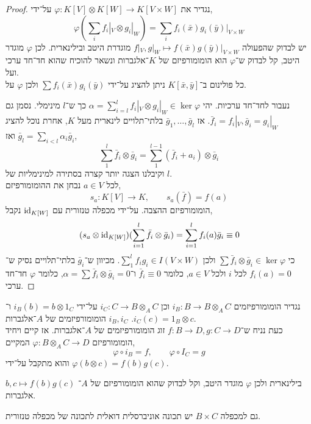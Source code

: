 \begin{proof}
	נגדיר את $\varphi : K[V] \otimes K[W] \to K[V \times W]$ על־ידי,
	\[
		\varphi(\sum_i f_i |_V \otimes g_i |_W)
		= \sum_i f_i(\bar{x}) g_i(\bar{y}) |_{V \times W}
	\]
	יש לבדוק שהפעולה $f |_V, g |_W \mapsto f(\bar{x}) g(\bar{y}) |_{V \times W}$ מוגדרת היטב ובילינארית.
	לכן $\varphi$ מוגדר היטב, קל לבדוק ש־$\varphi$ הוא הומומורפיזם של $K$־אלגברות ונשאר להוכיח שהוא חד־חד ערכי ועל. \\
	כל פולינום ב־$K[\bar{x}, \bar{y}]$ ניתן להציג על־ידי $\sum f_i(\bar{x}) g_i(\bar{y})$ ולכן $\varphi$ על.

	נעבור לחד־חד ערכיות.
	יהי $\alpha = \sum_{i = l}^l f_i |_V \otimes g_i |_W \in \ker \varphi$ כך ש־$l$ מינימלי.
	נסמן גם $\bar{f}_i = f_i |_V, \bar{g}_i = g_i |_W$.
	אז $\bar{g}_1, \ldots, \bar{g}_l$ בלתי־תלויים לינארית מעל $K$, אחרת נוכל להציג $\bar{g}_l = \sum_{i < l} \alpha_i \bar{g}_i$ ואז,
	\[
		\sum_1^l \bar{f}_i \otimes \bar{g}_i
		= \sum_1^{l - 1} (\bar{f}_i + a_i) \otimes \bar{g}_i
	\]
	וקיבלנו הצגה יותר קצרה בסתירה למינימליות של $l$. \\
	לכל $a \in V$ נבחן את ההומומורפיזם,
	\[
		s_a : K[V] \to K,
		\qquad
		s_a(\bar{f}) = f(a)
	\]
	הומומורפיזם ההצבה.
	על־ידי מכפלה טנזורית עם $\operatorname{id}_{K[W]}$ נקבל,
	\[
		(s_a \otimes \operatorname{id}_{K[W]})(\sum_{i = 1}^l \bar{f}_i \otimes \bar{g}_i)
		= \sum_{i = 1}^l f_i(a) \bar{g}_i
		\equiv 0
	\]
	כי $\sum \bar{f}_i \otimes \bar{g}_i \in \ker \varphi$ ולכן $\sum_1^l f_i g_i \in I(V \times W)$.
	מכיוון ש־$\bar{g}_i$ בלתי־תלויים נסיק ש־$f_i(a) = 0$ לכל $i$ ולכל $a \in V$, כלומר $\bar{f}_i \equiv 0$ ו־$\alpha = \sum \bar{f}_i \otimes \bar{g}_i = 0$, כלומר $\varphi$ חד־חד ערכי.
\end{proof}
\begin{theorem}
	נגדיר הומומורפיזמים $i_B : B \to B \otimes_A C$ וכן $i_C : C \to B \otimes_A C$ על־ידי $i_B(b) = b \otimes 1_C$ ו־$i_C(c) = 1_B \otimes c$.
	$i_B, i_C$ הומומורפיזמים של $A$־אלגברות. \\
	כעת נניח ש־$f : B \to D, g : C \to D$ זוג הומומורפיזמים של $A$־אלגברות.
	אז קיים ויחיד הומומורפיזם $\varphi : B \otimes_A C \to D$ המקיים,
	\[
		\varphi \circ i_B = f,
		\qquad
		\varphi \circ I_C = g
	\]
	והוא מתקבל על־ידי $\varphi(b \otimes c) = f(b) g(c)$.
\end{theorem}
$b, c \mapsto f(b) g(c)$ בילינארית ולכן $\varphi$ מוגדר היטב, וקל לבדוק שהוא הומומורפיזם של $A$־אלגברות.
\begin{remark}
	 גם למכפלה $B \times C$ יש תכונה אוניברסלית דואלית לתכונה של מכפלה טנזורית.
\end{remark}

